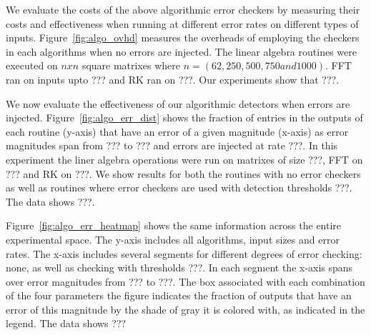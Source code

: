 \documentclass{sig-alternate}
\begin{document}
We evaluate the costs of the above algorithmic error checkers by measuring their costs and effectiveness when running at different error rates on different types of inputs.
Figure~\ref{fig:algo_ovhd} measures the overheads of employing the checkers in each algorithms when no errors are injected.
The linear algebra routines were executed on $nxn$ square matrixes where $n=(62, 250, 500, 750 and 1000)$.
FFT ran on inputs upto ??? and RK ran on ???.
Our experiments show that ???.


We now evaluate the effectiveness of our algorithmic detectors when errors are injected.
Figure~\ref{fig:algo_err_dist} shows the fraction of entries in the outputs of each routine (y-axis) that have an error of a given magnitude (x-axis) as error magnitudes span from ??? to ??? and errors are injected at rate ???.
In this experiment the liner algebra operations were run on matrixes of size ???, FFT on ??? and RK on ???.
We show results for both the routines with no error checkers as well as routines where error checkers are used with detection thresholds ???.
The data shows ???.

Figure~\ref{fig:algo_err_heatmap} shows the same information across the entire experimental space.
The y-axis includes all algorithms, input sizes and error rates.
The x-axis includes several segments for different degrees of error checking: none, as well as checking with thresholds ???. In each segment the x-axis spans over error magnitudes from ??? to ???.
The box associated with each combination of the four parameters the figure indicates the fraction of outputs that have an error of this magnitude by the shade of gray it is colored with, as indicated in the legend.
The data shows ???
\end{document}
